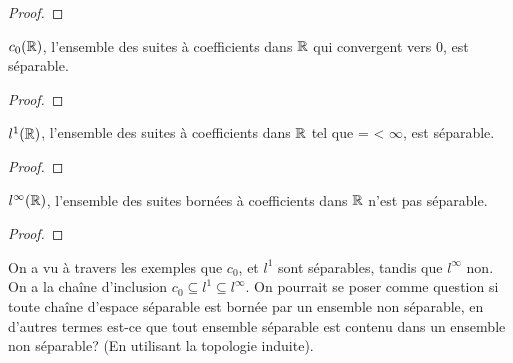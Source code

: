 \begin{proof}
	
\end{proof}

\begin{proposition}
	$c_{0}(\mathbb{R})$, l'ensemble des suites à coefficients dans $\mathbb{R}$
	qui convergent vers 0, est séparable.
\end{proposition}

\begin{proof}
	
\end{proof}

\begin{proposition}
	$l^{1}(\mathbb{R})$, l'ensemble des suites à coefficients dans $\mathbb{R}$
	tel que  =  < $\infty$, est
	séparable.
\end{proposition}

\begin{proof}
	
\end{proof}

\begin{proposition}
	$l^{\infty}(\mathbb{R})$, l'ensemble des suites bornées à coefficients dans
	$\mathbb{R}$ n'est pas séparable.
\end{proposition}

\begin{proof}
	
\end{proof}

\begin{question}
	On a vu à travers les exemples que $c_{0}$, et $l^{1}$ sont séparables,
	tandis que $l^{\infty}$ non. On a la chaîne d'inclusion $c_{0} \subseteq
	l^{1} \subseteq l^{\infty}$.
	On pourrait se poser comme question si toute chaîne d'espace séparable
	est bornée par un ensemble non séparable, en d'autres termes est-ce que tout
	ensemble séparable est contenu dans un ensemble non séparable? (En
	utilisant la topologie induite).
\end{question}
